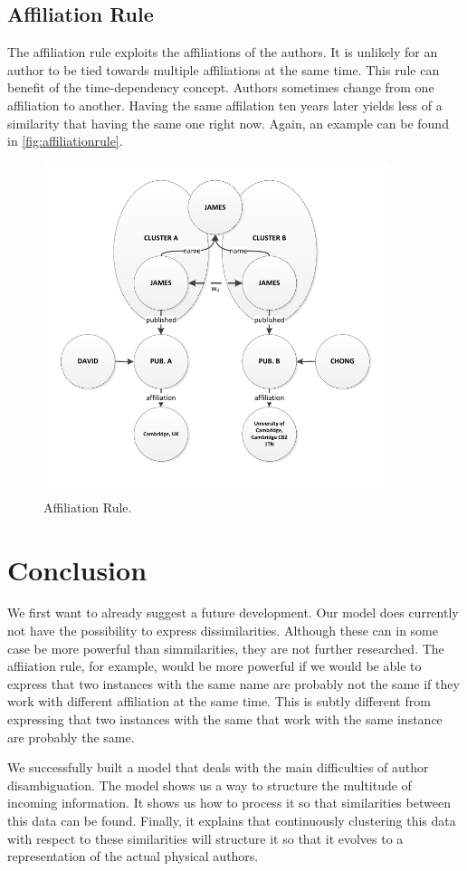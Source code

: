 \subsection{Affiliation Rule}

The affiliation rule exploits the affiliations of the authors. It is unlikely for an author to be tied towards multiple affiliations at the same time. This rule can benefit of the time-dependency concept. Authors sometimes change from one affiliation to another. Having the same affilation ten years later yields less of a similarity that having the same one right now. Again, an example can be found in \autoref{fig:affiliationrule}.

\begin{figure}[h!]
	\centering
		\includegraphics[width=0.9\textwidth]{fig/affiliationrule}
	\caption{Affiliation Rule.}
	\label{fig:affiliationrule}
\end{figure}

\section{Conclusion}

We first want to already suggest a future development. Our model does currently not have the possibility to express dissimilarities. Although these can in some case be more powerful than simmilarities, they are not further researched. The affiiation rule, for example, would be more powerful if we would be able to express that two instances with the same name are probably not the same if they work with different affiliation at the same time. This is subtly different from expressing that two instances with the same that work with the same instance are probably the same.

We successfully built a model that deals with the main difficulties of author disambiguation. The model shows us a way to structure the multitude of incoming information. It shows us how to process it so that similarities between this data can be found. Finally, it explains that continuously clustering this data with respect to these similarities will structure it so that it evolves to a representation of the actual physical authors.

